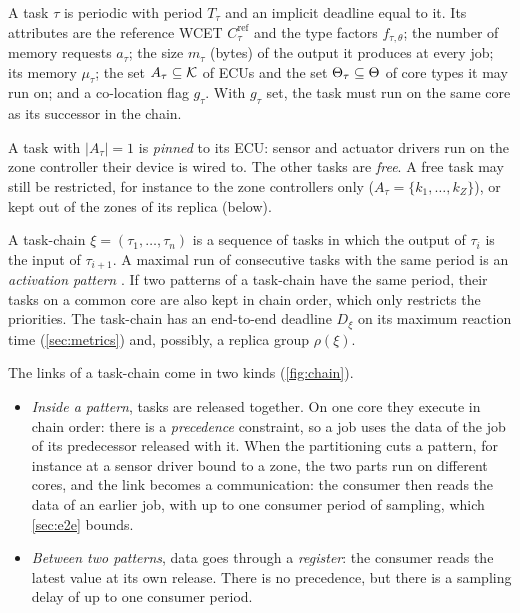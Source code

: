 \begin{definition}[Task]
A task $\tau$ is periodic with period $T_\tau$ and an implicit deadline
equal to it. Its attributes are the reference WCET $C^{\mathrm{ref}}_\tau$
and the type factors $f_{\tau,\theta}$; the number of memory requests
$a_\tau$; the size $m_\tau$ (bytes) of the output it produces at every
job; its memory $\mu_\tau$; the set $A_\tau\subseteq\mathcal{K}$ of ECUs and the
set $\Theta_\tau\subseteq\Theta$ of core types it may run on; and a
co-location flag $g_\tau$. With $g_\tau$ set, the task must run on the
same core as its successor in the chain.
\end{definition}

A task with $|A_\tau|=1$ is \emph{pinned} to its ECU: sensor and actuator
drivers run on the zone controller their device is wired to. The other
tasks are \emph{free}. A free task may still be restricted, for instance
to the zone controllers only ($A_\tau=\{k_1,\dots,k_Z\}$), or kept out of
the zones of its replica (below).

\begin{definition}
A task-chain $\xi=(\tau_1,\dots,\tau_n)$ is a sequence of tasks in which
the output of $\tau_i$ is the input of $\tau_{i+1}$. A maximal run of
consecutive tasks with the same period is an \emph{activation pattern}
\cite{kramer2015waters}. If two patterns of a task-chain have the same
period, their tasks on a common core are also kept in chain order, which
only restricts the priorities. The task-chain has an end-to-end deadline $D_\xi$
on its maximum reaction time (\cref{sec:metrics}) and, possibly, a replica
group $\rho(\xi)$.
\end{definition}

The links of a task-chain come in two kinds (\cref{fig:chain}).
\begin{itemize}
\item \emph{Inside a pattern}, tasks are released together. On one core
they execute in chain order: there is a \emph{precedence} constraint, so
a job uses the data of the job of its predecessor released with it. When
the partitioning cuts a pattern, for instance at a sensor driver bound to
a zone, the two parts run on different cores, and the link becomes a
communication: the consumer then reads the data of an earlier job, with up
to one consumer period of sampling, which \cref{sec:e2e} bounds.
\item \emph{Between two patterns}, data goes through a \emph{register}:
the consumer reads the latest value at its own release. There is no
precedence, but there is a sampling delay of up to one consumer period.
\end{itemize}

